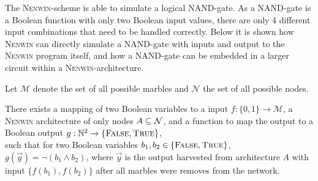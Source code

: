 The \textsc{Nenwin}-scheme is able to simulate a logical NAND-gate.
As a NAND-gate is a Boolean function with only two Boolean input values, there are only 4 different input combinations that need to be handled correctly. Below it is shown how \textsc{Nenwin} can directly simulate a NAND-gate with inputs and output to the \textsc{Nenwin} program itself, and how a NAND-gate can be embedded in a larger circuit within a \textsc{Nenwin}-architecture. 

Let $\mathcal{M}$ denote the set of all possible marbles and $\mathcal{N}$ the set of all possible nodes. 
\begin{lemma}
There exists a mapping of two Boolean variables to a \nenwin  input $f:\{0, 1\} \rightarrow\mathcal{M}$,
a \textsc{Nenwin} architecture of only nodes $A \subseteq \mathcal{N}$, and a function to map the \nenwin output to a Boolean output $g:\mathbb{N}^2 \rightarrow \{\textsc{False}, \textsc{True}\}$,\\
such that for two Boolean variables $b_1, b_2 \in \{\textsc{False}, \textsc{True}\}$, $g(\vec{y}) = \neg (b_1 \land b_2)$, where $\vec{y}$ is the output harvested from architecture $A$ with input $\{f(b_1), f(b_2)\}$ after all marbles were removes from the network.
\end{lemma}
